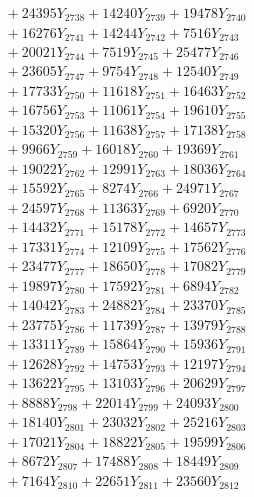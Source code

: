 \documentclass[a4paper,10pt]{article}
\begin{document}
{\begin{align}
&\;  + 24395 Y_{2738} + 14240 Y_{2739} + 19478 Y_{2740} \\[0.3ex]
&\;  + 16276 Y_{2741} + 14244 Y_{2742} + 7516 Y_{2743} \\[0.3ex]
&\;  + 20021 Y_{2744} + 7519 Y_{2745} + 25477 Y_{2746} \\[0.3ex]
&\;  + 23605 Y_{2747} + 9754 Y_{2748} + 12540 Y_{2749} \\[0.3ex]
&\;  + 17733 Y_{2750} + 11618 Y_{2751} + 16463 Y_{2752} \\[0.3ex]
&\;  + 16756 Y_{2753} + 11061 Y_{2754} + 19610 Y_{2755} \\[0.3ex]
&\;  + 15320 Y_{2756} + 11638 Y_{2757} + 17138 Y_{2758} \\[0.5ex]\allowbreak
&\;  + 9966 Y_{2759} + 16018 Y_{2760} + 19369 Y_{2761} \\[0.3ex]
&\;  + 19022 Y_{2762} + 12991 Y_{2763} + 18036 Y_{2764} \\[0.3ex]
&\;  + 15592 Y_{2765} + 8274 Y_{2766} + 24971 Y_{2767} \\[0.3ex]
&\;  + 24597 Y_{2768} + 11363 Y_{2769} + 6920 Y_{2770} \\[0.3ex]
&\;  + 14432 Y_{2771} + 15178 Y_{2772} + 14657 Y_{2773} \\[0.3ex]
&\;  + 17331 Y_{2774} + 12109 Y_{2775} + 17562 Y_{2776} \\[0.3ex]
&\;  + 23477 Y_{2777} + 18650 Y_{2778} + 17082 Y_{2779} \\[0.3ex]
&\;  + 19897 Y_{2780} + 17592 Y_{2781} + 6894 Y_{2782} \\[0.3ex]
&\;  + 14042 Y_{2783} + 24882 Y_{2784} + 23370 Y_{2785} \\[0.3ex]
&\;  + 23775 Y_{2786} + 11739 Y_{2787} + 13979 Y_{2788} \\[0.5ex]\allowbreak
&\;  + 13311 Y_{2789} + 15864 Y_{2790} + 15936 Y_{2791} \\[0.3ex]
&\;  + 12628 Y_{2792} + 14753 Y_{2793} + 12197 Y_{2794} \\[0.3ex]
&\;  + 13622 Y_{2795} + 13103 Y_{2796} + 20629 Y_{2797} \\[0.3ex]
&\;  + 8888 Y_{2798} + 22014 Y_{2799} + 24093 Y_{2800} \\[0.3ex]
&\;  + 18140 Y_{2801} + 23032 Y_{2802} + 25216 Y_{2803} \\[0.3ex]
&\;  + 17021 Y_{2804} + 18822 Y_{2805} + 19599 Y_{2806} \\[0.3ex]
&\;  + 8672 Y_{2807} + 17488 Y_{2808} + 18449 Y_{2809} \\[0.3ex]
&\;  + 7164 Y_{2810} + 22651 Y_{2811} + 23560 Y_{2812} \\[0.3ex]

\end{align}}
\end{document}
